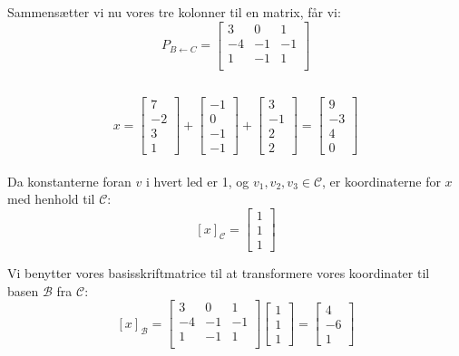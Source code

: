 \documentclass[a4paper,12pt]{article}
\begin{document}
Sammensætter vi nu vores tre kolonner til en matrix, får vi:\\
\[
P_{B\leftarrow C} = 
\left[\begin{array}{ccc}
    3 & 0 & 1\\
    -4 & -1 & -1\\
    1 & -1 & 1\\
\end{array}\right]
\]

\subsection{}
\[
x = 
\left[\begin{array}{ccc}
    7\\
    -2\\
    3\\
    1
\end{array}\right]
+
\left[\begin{array}{ccc}
    -1\\
    0\\
    -1\\
    -1
\end{array}\right]
+
\left[\begin{array}{ccc}
    3\\
    -1\\
    2\\
    2
\end{array}\right]
=
\left[\begin{array}{ccc}
    9\\
    -3\\
    4\\
    0
\end{array}\right]
\]\\

Da konstanterne foran $v$ i hvert led er 1, og $v_1, v_2, v_3 \in \mathcal{C}$, er koordinaterne for $x$ med henhold til $\mathcal{C}$:
\[
[x]_\mathcal{C} = 
\left[\begin{array}{ccc}
    1\\
    1\\
    1
\end{array}\right]
\]

Vi benytter vores basisskriftmatrice til at transformere vores koordinater til basen $\mathcal{B}$ fra $\mathcal{C}$:
\[
[x]_\mathcal{B} = 
\left[\begin{array}{ccc}
    3 & 0 & 1\\
    -4 & -1 & -1\\
    1 & -1 & 1\\
\end{array}\right]
\left[\begin{array}{ccc}
    1\\
    1\\
    1
\end{array}\right]
=
\left[\begin{array}{ccc}
    4\\
    -6\\
    1
\end{array}\right]
\]
\end{document}
